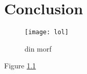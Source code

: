 \documentclass[Main]{subfiles}
\begin{document}
\chapter{Conclusion} %
\label{cha:conclusion}


\begin{figure}[H]
	\centering
	\texttt{[image: lol]}
	\caption{din morf}
	\label{fig:lol}
\end{figure}


Figure \ref{fig:lol}
\end{document}
